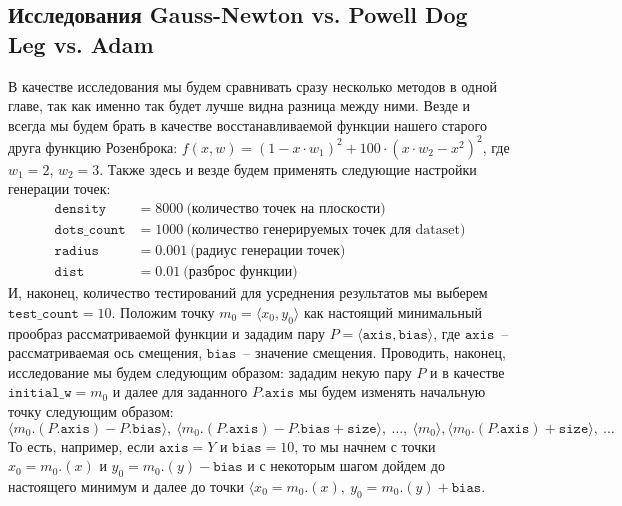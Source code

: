 \documentclass[12pt, a4paper, oneside, final]{article}
\begin{document}
	\subsection*{Исследования Gauss-Newton vs. Powell Dog Leg vs. Adam}
	В качестве исследования мы будем сравнивать сразу несколько методов в одной главе, так как именно так будет лучше видна разница между ними.
	Везде и всегда мы будем брать в качестве восстанавливаемой функции нашего старого друга функцию Розенброка: $f(x, w) = (1 - x \cdot w_{1})^{2} + 100 \cdot (x \cdot w_{2} - x^{2})^{2}$, где $w_{1} = 2$, $w_{2} = 3$.
	Также здесь и везде будем применять следующие настройки генерации точек:
	\begin{align*}
		\mathtt{density} &= 8000~\text{(количество точек на плоскости)} \\
		\mathtt{dots\_count} &= 1000~\text{(количество генерируемых точек для dataset)} \\
		\mathtt{radius} &= 0.001~\text{(радиус генерации точек)} \\
		\mathtt{dist} &= 0.01~\text{(разброс функции)}
	\end{align*}
	И, наконец, количество тестирований для усреднения результатов мы выберем $\mathtt{test\_count} = 10$.
	Положим точку $m_{0} = \langle x_0, y_0 \rangle$ как настоящий минимальный прообраз рассматриваемой функции и зададим пару $P = \langle \mathtt{axis}, \mathtt{bias} \rangle$, где $\mathtt{axis}$~-- рассматриваемая ось смещения, $\mathtt{bias}$~-- значение смещения.
	Проводить, наконец, исследование мы будем следующим образом: зададим некую пару $P$ и в качестве $\mathtt{initial\_w} = m_{0}$ и далее для заданного $P.\mathtt{axis}$ мы будем изменять начальную точку следующим образом:
	\[
		\langle m_{0}.(P.\mathtt{axis}) - P.\mathtt{bias} \rangle, ~ \langle m_{0}.(P.\mathtt{axis}) - P.\mathtt{bias} + \mathtt{size} \rangle, ~ \ldots, ~ \langle m_{0} \rangle, \langle m_{0}.(P.\mathtt{axis}) + \mathtt{size} \rangle, ~ \ldots
	\]
	То есть, например, если $\mathtt{axis} = Y$ и $\mathtt{bias} = 10$, то мы начнем с точки $x_{0} = m_{0}.(x)$ и $y_{0} = m_{0}.(y) - \mathtt{bias}$ и с некоторым шагом дойдем до настоящего минимум и далее до точки $\langle x_{0} = m_{0}.(x), ~ y_{0} = m_{0}.(y) + \mathtt{bias}$.
\end{document}
